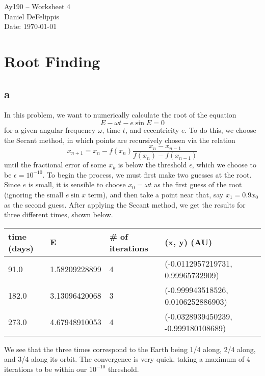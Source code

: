 \documentclass[11pt,letterpaper]{article}
\begin{document}
\begin{center}
\Large
Ay190 -- Worksheet 4\\
Daniel DeFelippis\\
Date: \today
\end{center}


\section{Root Finding}

\subsection*{a}

In this problem, we want to numerically calculate the root of the equation 
$$ E - \omega t - e\sin E = 0 $$ for a given angular frequency $\omega$, 
time $t$, and eccentricity $e$. To do this, we choose the Secant method, 
in which points are recursively chosen via the relation
$$ x_{n+1} = x_n - f(x_n) \frac{x_n - x_{n-1}}{f(x_n) - f(x_{n-1})} $$
until the fractional error of some $x_k$ is below the threshold $\epsilon$, 
which we choose to be $\epsilon = 10^{-10}$. To begin the process, we must
first make two guesses at the root. Since $e$ is small, it is sensible to
choose $x_0 = \omega t$ as the first guess of the root (ignoring the small 
$e\sin x$ term), and then take a point near that, say $x_1 = 0.9x_0$ as the
second guess. After applying the Secant method, we get the results for three different times, shown below.

\begin{center}
    \begin{tabular}{| l | l | l | l |}
    \hline
    time (days) & E & \# of iterations & (x, y) (AU)\\ \hline
    91.0 & 1.58209228899 & 4 & (-0.0112957219731, 0.99965732909) \\ \hline
    182.0 & 3.13096420068 & 3 & (-0.999943518526, 0.0106252886903) \\ \hline
    273.0 & 4.67948910053 & 4 & (-0.0328939450239, -0.999180108689) \\
    \hline
    \end{tabular}
\end{center}

We see that the three times correspond to the Earth being 1/4 along, 2/4
along, and 3/4 along its orbit. The convergence is very quick, taking a
maximum of 4 iterations to be within our $10^{-10}$ threshold.     
\end{document}
